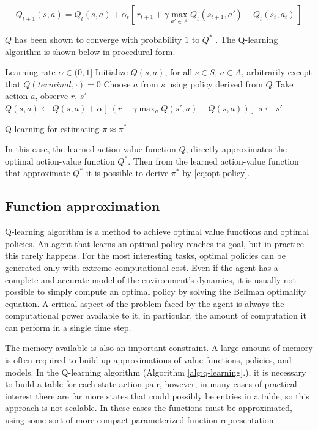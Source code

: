 \documentclass{article}
\begin{document}
\begin{equation}
	Q_{t+1}(s, a) = Q_t(s, a) + \alpha_t [\, r_{t+1} + \gamma \max_{a' \in A} Q_t(s_{t+1}, a') - Q_t(s_t, a_t)\,]
\end{equation}

$Q$ has been shown to converge with probability $1$ to $Q^*$ \cite{10.5555/3312046}. The Q-learning algorithm is shown below in procedural form.

\begin{algorithm}[H]
	\begin{algorithmic}
		\Require
		\Statex Learning rate $\alpha \in (0, 1]$
		\State Initialize $Q(s,a)$, for all $s \in S$, $a \in A$, arbitrarily except that $Q(terminal, \cdot ) = 0$
		\State Choose $a$ from $s$ using policy derived from $Q$
		\State Take action $a$, observe $r$, $s'$
		\State $Q(s, a) \gets Q(s, a) + \alpha [\cdot (r + \gamma  \max_{a} Q(s', a) - Q(s,a))]$
		\State $s \gets s'$
		\EndWhile
		\EndProcedure
	\end{algorithmic}
	\caption{Q-learning for estimating $\pi \approx \pi^*$}
	\label{alg:q-learning}
\end{algorithm}

In this case, the learned action-value function $Q$, directly approximates the optimal action-value function $Q^*$. Then from the learned action-value function that approximate $Q^*$ it is possible to derive $\pi^*$ by \autoref{eq:opt-policy}.

\subsection{Function approximation}
Q-learning algorithm is a method to achieve optimal value functions and optimal policies. An agent that learns an optimal policy reaches its goal, but in practice this rarely happens. For the most interesting tasks, optimal policies can be generated only with extreme computational cost. Even if the agent has a complete and accurate model of the environment's dynamics, it is usually not possible to simply compute an optimal policy by solving the Bellman optimality equation. A critical aspect of the problem faced by the agent is always the computational power available to it, in particular, the amount of computation it can perform in a single time step.

The memory available is also an important constraint. A large amount of memory is often required to build up approximations of value functions, policies, and models. In the Q-learning algorithm (Algorithm \ref{alg:q-learning}.), it is necessary to build a table for each state-action pair, however, in many cases of practical interest there are far more states that could possibly be entries in a table, so this approach is not scalable. In these cases the functions must be approximated, using some sort of more compact parameterized function representation.
\end{document}
